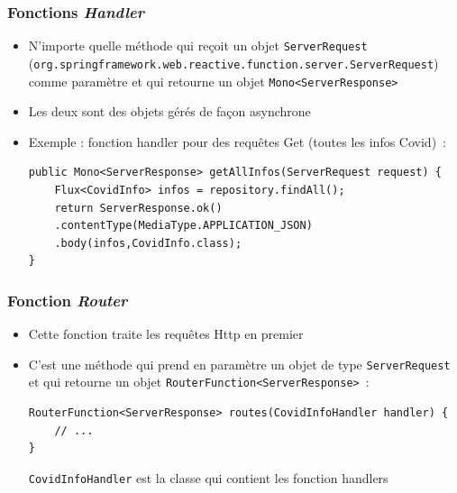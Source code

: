 \documentclass{beamer}
\begin{document}
\begin{frame}[fragile]
	\frametitle{Fonctions \textit{Handler}}
	\begin{itemize}
		\item N'importe quelle méthode qui reçoit un objet \texttt{ServerRequest} ({\scriptsize \texttt{org.springframework.web.reactive.function.server.ServerRequest}}) comme paramètre et qui retourne un objet \texttt{Mono<ServerResponse>}
		\item Les deux sont des objets gérés de façon asynchrone
		\item Exemple : fonction handler pour des requêtes Get (toutes les infos Covid)~:
\begin{lstlisting}
public Mono<ServerResponse> getAllInfos(ServerRequest request) {
	Flux<CovidInfo> infos = repository.findAll();
	return ServerResponse.ok()
	.contentType(MediaType.APPLICATION_JSON)
	.body(infos,CovidInfo.class);
}
\end{lstlisting}
	\end{itemize}
\end{frame}

\begin{frame}[fragile]
	\frametitle{Fonction \textit{Router}}
	\begin{itemize}
		\item Cette fonction traite les requêtes Http en premier
		\item C'est une méthode qui prend en paramètre un objet de type \texttt{ServerRequest} et qui retourne un objet \texttt{RouterFunction<ServerResponse>}~:
\begin{lstlisting}
RouterFunction<ServerResponse> routes(CovidInfoHandler handler) {
	// ...
}
\end{lstlisting}
	\texttt{CovidInfoHandler} est la classe qui contient les fonction handlers
	\end{itemize}
\end{frame}
\end{document}
